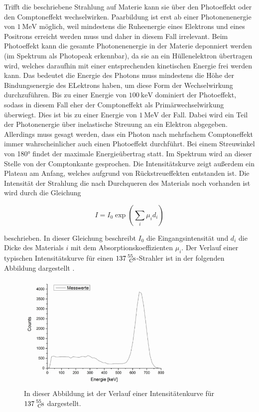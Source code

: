 Trifft die beschriebene Strahlung auf Materie kann sie über den Photoeffekt oder den 
Comptoneffekt wechselwirken. Paarbildung ist erst ab einer Photonenenergie von 
$\SI{1}{\mega\eV}$ möglich, weil mindestens die Ruheenergie eines Elektrons und eines 
Positrons erreicht werden muss und daher in diesem Fall irrelevant.
Beim Photoeffekt kann die gesamte Photonenenergie in der Materie deponniert werden
(im Spektrum als Photopeak erkennbar), 
da sie an ein Hüllenelektron übertragen wird, welches daraufhin mit einer 
entsprechenden kinetischen Energie frei werden kann. Das bedeutet die Energie des Photons 
muss mindestens die Höhe der Bindungsenergie des ELektrons haben, um diese Form der 
Wechselwirkung durchzuführen. Bis zu einer Energie von $\SI{100}{\kilo\eV}$ dominiert 
der Photoeffekt, sodass in diesem Fall eher der Comptoneffekt als Primärwechselwirkung überwiegt.
Dies ist bis zu einer Energie von $\SI{1}{\mega\eV}$ der Fall. Dabei wird ein Teil der 
Photonenergie über inelastische Streuung an ein Elektron abgegeben.
Allerdings muss gesagt werden, dass ein Photon nach mehrfachem Comptoneffekt immer 
wahrscheinlicher auch einen Photoeffekt durchführt. Bei einem 
Streuwinkel von 180° findet der maximale Energieübertrag statt. Im Spektrum wird an 
dieser Stelle von der Comptonkante gesprochen. 
Die Intensitätskurve zeigt außerdem ein Plateau am Anfang, welches aufgrund von 
Rückstreueffekten entstanden ist. Die Intensität der Strahlung die 
nach Durchqueren des Materials noch vorhanden ist wird durch die Gleichung 

\begin{equation}
	I = I_0 \exp \left( \sum_i \mu_i d_i \right)
	\label{eq1}
\end{equation}

beschrieben. In dieser Gleichung beschreibt $I_0$ die Eingangsintensität und $d_i$ die 
Dicke des Materials $i$ mit dem Absorptionskoeffizienten $\mu_{i}$. Der 
Verlauf einer typischen Intensitätskurve für einen 
$\ce{137^55_Cs}$-Strahler ist in der folgenden Abbildung dargestellt \cite{Kerne}.

\begin{figure}
	\centering
	\includegraphics[width=0.7\textwidth]{figure/Kurve.pdf}
	\caption{In dieser Abbildung ist der Verlauf einer Intensitätenkurve für 
	$\ce{137^55_Cs}$ dargestellt.}
	\label{abbkurve}
\end{figure}
\FloatBarrier

